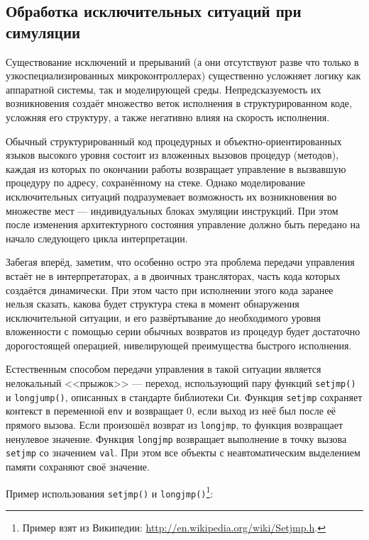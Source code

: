 \subsection[Обработка исключительных ситуаций]{Обработка исключительных ситуаций при симуляции}

Существование исключений и прерываний (а они отсутствуют разве что только в узкоспециализированных микроконтроллерах) существенно усложняет логику как аппаратной системы, так и моделирующей среды. Непредсказуемость их возникновения создаёт множество веток исполнения в структурированном коде, усложняя его структуру, а также негативно влияя на скорость исполнения.

Обычный структурированный код про\-це\-дур\-ных и объек\-тно-ори\-ен\-ти\-ро\-ван\-ных языков высокого уровня состоит из вложенных вызовов процедур (методов), каждая из которых по окончании работы возвращает управление в вызвавшую процедуру по адресу, сохранённому на стеке. Однако  моделирование исключительных ситуаций подразумевает возможность их возникновения во множестве мест --- индивидуальных блоках эмуляции инструкций. При этом после изменения архитектурного состояния управление должно быть передано на начало следующего цикла интерпретации.

Забегая вперёд, заметим, что особенно остро эта проблема передачи управления встаёт не в интерпретаторах, а в двоичных трансляторах, часть кода которых создаётся динамически. При этом часто при исполнении этого кода заранее нельзя сказать, какова будет структура стека в момент обнаружения исключительной ситуации, и его развёртывание до необходимого уровня вложенности с помощью серии обычных возвратов из процедур будет достаточно дорогостоящей операцией, нивелирующей преимущества быстрого исполнения.

Естественным способом передачи управления в такой ситуации является нелокальный <<прыжок>> --- переход, использующий пару функций \texttt{setjmp()} и \texttt{longjump()}, описанных в стандарте библиотеки Си. Функция \texttt{setjmp} сохраняет контекст в переменной \texttt{env} и возвращает 0, если выход из неё был после её прямого вызова. Если произошёл возврат из \texttt{longjmp}, то функция возвращает ненулевое значение.
Функция \texttt{longjmp} возвращает выполнение в точку вызова \texttt{setjmp} со значением \texttt{val}. При этом все объекты с неавтоматическим выделением памяти сохраняют своё значение.

Пример использования \texttt{setjmp()} и \texttt{longjmp()}\footnote{Пример взят из Википедии: \url{http://en.wikipedia.org/wiki/Setjmp.h}.}:

